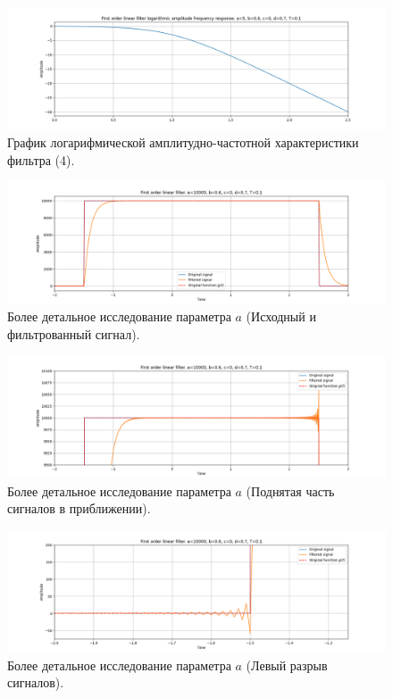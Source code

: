 \documentclass[a4paper, 12pt]{article}
\begin{document}
    \begin{figure}[H]
        \centering
        \includegraphics[scale=0.4]{4_lafr_filtered_linear.png}
        \captionsetup{skip=0pt}
        \caption{График логарифмической амплитудно-частотной характеристики фильтра (4).}
        \label{fig:filinlafr14}
    \end{figure}
    \begin{figure}[H]
        \centering
        \includegraphics[scale=0.4]{alin1.png}
        \captionsetup{skip=0pt}
        \caption{Более детальное исследование параметра $a$ (Исходный и фильтрованный сигнал).}
        \label{fig:alin1}
    \end{figure}
    \begin{figure}[H]
        \centering
        \includegraphics[scale=0.4]{alin2.png}
        \captionsetup{skip=0pt}
        \caption{Более детальное исследование параметра $a$ (Поднятая часть сигналов в приближении).}
        \label{fig:alin2}
    \end{figure}
    \begin{figure}[H]
        \centering
        \includegraphics[scale=0.4]{alin3.png}
        \captionsetup{skip=0pt}
        \caption{Более детальное исследование параметра $a$ (Левый разрыв сигналов).}
        \label{fig:alin3}
    \end{figure}
\end{document}
